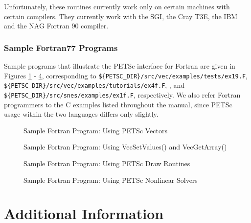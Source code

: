 Unfortunately, these routines currently work only on certain machines with 
certain compilers. They currently work with the SGI, the Cray T3E, the
IBM and the NAG Fortran 90 compiler.

\section{Sample Fortran77 Programs}
\label{sec:fortran-examples}

Sample programs that illustrate the PETSc interface for Fortran
are given in Figures \ref{fig:vec-Fortran} - \ref{fig:SNES-Fortran},
corresponding to
{\tt \$\{PETSC\_DIR\}/src/vec/examples/tests/ex19.F}, 
{\tt \$\{PETSC\_DIR\}/src/vec/examples/tutorials/ex4f.F}, 
, and 
{\tt \$\{PETSC\_DIR\}/src/snes/examples/ex1f.F}, respectively.  We also
refer Fortran programmers to the C examples listed throughout the manual,
since PETSc usage within the two languages differs only slightly.

\begin{figure}[H]
{\small
{}
}
\caption{Sample Fortran Program:  Using PETSc Vectors}
\label{fig:vec-Fortran}
\end{figure}

\begin{figure}[H]
{\small
{}
}
\caption{Sample Fortran Program:  Using VecSetValues() and VecGetArray()}
\label{fig:vec2-Fortran}
\end{figure}

\begin{figure}[H]
{\small
{}
}
\caption{Sample Fortran Program:  Using PETSc Draw Routines}
\label{fig:draw-Fortran}
\end{figure}

\begin{figure}[H]
{\small
{}
}
\caption{Sample Fortran Program:  Using PETSc Nonlinear Solvers}
\label{fig:SNES-Fortran}
\end{figure}

\part{Additional Information}
\label{part:usefulstuff}

